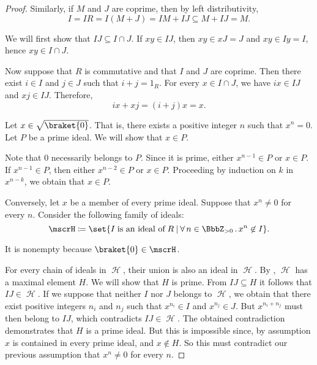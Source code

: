 \begin{proof}
  Similarly, if \( M \) and \( J \) are coprime, then by left distributivity,
  \begin{equation*}
    I = IR = I(M + J) = IM + IJ \subseteq M + IJ = M.
  \end{equation*}

   We will first show that \( IJ \subseteq I \cap J \). If \( xy \in IJ \), then \( xy \in xJ = J \) and \( xy \in Iy = I \), hence \( xy \in I \cap J \).

  Now suppose that \( R \) is commutative and that \( I \) and \( J \) are coprime. Then there exist \( i \in I \) and \( j \in J \) such that \( i + j = 1_R \). For every \( x \in I \cap J \), we have \( ix \in IJ \) and \( xj \in IJ \). Therefore,
  \begin{equation*}
    ix + xj = (i + j)x = x.
  \end{equation*}

  \SufficiencySubProof* Let \( x \in \sqrt{\braket{0}} \). That is, there exists a positive integer \( n \) such that \( x^n = 0 \). Let \( P \) be a prime ideal. We will show that \( x \in P \).

  Note that \( 0 \) necessarily belongs to \( P \). Since it is prime, either \( x^{n-1} \in P \) or \( x \in P \). If \( x^{n-1} \in P \), then either \( x^{n-2} \in P \) or \( x \in P \). Proceeding by induction on \( k \) in \( x^{n-k} \), we obtain that \( x \in P \).

  \NecessitySubProof* Conversely, let \( x \) be a member of every prime ideal. Suppose that \( x^n \neq 0 \) for every \( n \). Consider the following family of ideals:
  \begin{equation*}
    \mscrH \coloneqq \set{ I \T{is an ideal of} R \given \qforall {n \in \BbbZ_{>0}} x^n \not\in I }.
  \end{equation*}

  It is nonempty because \( \braket{0} \in \mscrH \).

  For every chain of ideals in \( \mscrH \), their union is also an ideal in \( \mscrH \). By , \( \mscrH \) has a maximal element \( H \). We will show that \( H \) is prime. From \( IJ \subseteq H \) it follows that \( IJ \in \mscrH \). If we suppose that neither \( I \) nor \( J \) belongs to \( \mscrH \), we obtain that there exist positive integers \( n_i \) and \( n_j \) such that \( x^{n_i} \in I \) and \( x^{n_j} \in J \). But \( x^{n_i + n_j} \) must then belong to \( IJ \), which contradicts \( IJ \in \mscrH \). The obtained contradiction demonstrates that \( H \) is a prime ideal. But this is impossible since, by assumption \( x \) is contained in every prime ideal, and \( x \not\in H \). So this must contradict our previous assumption that \( x^n \neq 0 \) for every \( n \).


\end{proof}
